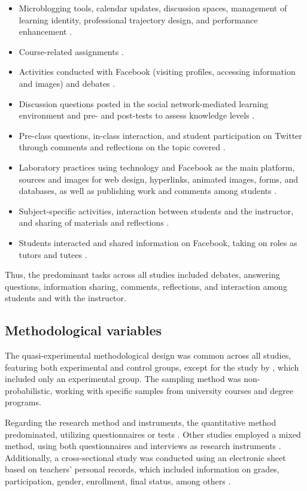 \documentclass[english]{textolivre}
\begin{document}
\begin{itemize}
    \item Microblogging tools, calendar updates, discussion spaces, management of learning identity, professional trajectory design, and performance enhancement \cite{alexiou2020}.
\item Course-related assignments \cite{almarzouki2022}.
\item Activities conducted with Facebook (visiting profiles, accessing information and images) and debates \cite{demirbilek2018}.
\item Discussion questions posted in the social network-mediated learning environment and pre- and post-tests to assess knowledge levels \cite{penalba2020}.
\item Pre-class questions, in-class interaction, and student participation on Twitter through comments and reflections on the topic covered \cite{perezsuasnavas2022}.
\item Laboratory practices using technology and Facebook as the main platform, sources and images for web design, hyperlinks, animated images, forms, and databases, as well as publishing work and comments among students \cite{salasrueda2019}.
\item Subject-specific activities, interaction between students and the instructor, and sharing of materials and reflections \cite{salasrueda2018}.
\item Students interacted and shared information on Facebook, taking on roles as tutors and tutees \cite{zulkifli2018}.
\end{itemize}

Thus, the predominant tasks across all studies included debates, answering questions, information sharing, comments, reflections, and interaction among students and with the instructor.

\subsection{Methodological variables}
The quasi-experimental methodological design was common across all studies, featuring both experimental and control groups, except for the study by \textcite{zulkifli2018}, which included only an experimental group. The sampling method was non-probabilistic, working with specific samples from university courses and degree programs.

Regarding the research method and instruments, the quantitative method predominated, utilizing questionnaires or tests \cite{alexiou2020, almarzouki2022, demirbilek2018, salasrueda2018, zulkifli2018}. Other studies employed a mixed method, using both questionnaires and interviews as research instruments \cite{penalba2020, salasrueda2019}. Additionally, a cross-sectional study was conducted using an electronic sheet based on teachers’ personal records, which included information on grades, participation, gender, enrollment, final status, among others \cite{perezsuasnavas2022}. 
\end{document}
